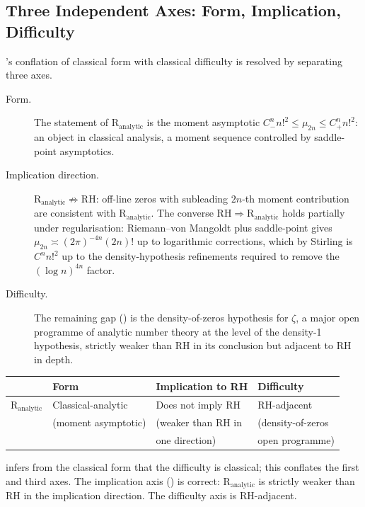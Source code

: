 \subsection{Three Independent Axes: Form, Implication, Difficulty}
\label{v4-arith:r-audit:axis-distinction}

's conflation of classical
form with classical difficulty is resolved by separating three axes.

\begin{description}
\item[Form.] The statement of \(\mathrm{R}_{\mathrm{analytic}}\) is
the moment asymptotic
\(C_{-}^{n}n!^{2}\leq\mu_{2n}\leq C_{+}^{n}n!^{2}\): an object
in classical analysis, a moment sequence controlled by
saddle-point asymptotics.
\item[Implication direction.] \(\mathrm{R}_{\mathrm{analytic}}
\not\Rightarrow\mathrm{RH}\): off-line zeros with subleading
\(2n\)-th moment contribution are consistent with
\(\mathrm{R}_{\mathrm{analytic}}\). The converse
\(\mathrm{RH}\Rightarrow\mathrm{R}_{\mathrm{analytic}}\) holds
partially under regularisation: Riemann--von Mangoldt plus
saddle-point gives \(\mu_{2n}\asymp (2\pi)^{-4n}(2n)!\) up to
logarithmic corrections, which by Stirling is \(C^{n}n!^{2}\) up
to the density-hypothesis refinements required to remove the
\((\log n)^{4n}\) factor.
\item[Difficulty.] The remaining gap
() is the
density-of-zeros hypothesis for \(\zeta\), a major open programme
of analytic number theory at the level of the density-1 hypothesis,
strictly weaker than RH in its conclusion but adjacent to RH in depth.
\end{description}

\begin{center}
\begin{tabular}{|l|l|l|l|}
\hline
 & \textbf{Form} & \textbf{Implication to RH} & \textbf{Difficulty} \\
\hline
\(\mathrm{R}_{\mathrm{analytic}}\) & Classical-analytic & Does not imply RH & RH-adjacent \\
 & (moment asymptotic) & (weaker than RH in & (density-of-zeros \\
 & & one direction) & open programme) \\
\hline
\end{tabular}
\end{center}

 infers from the classical
form that the difficulty is classical; this conflates the first and
third axes. The implication axis ()
is correct: \(\mathrm{R}_{\mathrm{analytic}}\) is strictly weaker
than RH in the implication direction. The difficulty axis is
RH-adjacent.


